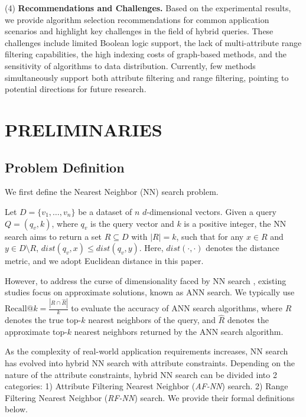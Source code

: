 \documentclass[sigconf, nonacm]{acmart}
\begin{document}
	(4)\textbf{ Recommendations and Challenges.}
	Based on the experimental results, we provide algorithm selection recommendations for common application scenarios and highlight key challenges in the field of hybrid queries. These challenges include limited Boolean logic support, the lack of multi-attribute range filtering capabilities, the high indexing costs of graph-based methods, and the sensitivity of algorithms to data distribution. Currently, few methods simultaneously support both attribute filtering and range filtering, pointing to potential directions for future research.
	
	\section{PRELIMINARIES}
	
	\subsection{Problem Definition}
	
	We first define the Nearest Neighbor (NN) search problem.
	
	\begin{definition}[NN Search]
		
		Let \( D = \{v_1, \ldots, v_n\} \) be a dataset of \( n \) \( d \)-dimensional vectors. Given a query \( Q = (q_v, k) \), where \( q_v \) is the query vector and \( k \) is a positive integer, the NN search aims to return a set \( R \subseteq D \) with \( |R| = k \), such that for any \( x \in R \) and \( y \in D \setminus R \), \( \textit{dist}\!\left(q_v, x\right) \leq \textit{dist}\!\left(q_v, y\right) \). Here, \( \textit{dist}\!\left(\cdot, \cdot\right) \) denotes the distance metric, and we adopt Euclidean distance in this paper.
	\end{definition}
	
	However, to address the curse of dimensionality faced by NN search \cite{dimcurse}, existing studies focus on approximate solutions, known as ANN  search. We typically use $\text{Recall}@k = \frac{|R \cap \hat{R}|}{k}$ to evaluate the accuracy of ANN search algorithms, where $R$ denotes the true top-$k$ nearest neighbors of the query, and $\hat{R}$ denotes the approximate top-$k$ nearest neighbors returned by the ANN search algorithm.
	
	As the complexity of real-world application requirements increases, NN search has evolved into hybrid NN search with attribute constraints. Depending on the nature of the attribute constraints, hybrid NN search can be divided into 2 categories: 1) Attribute Filtering Nearest Neighbor (\textit{AF-NN}) search. 2) Range Filtering Nearest Neighbor (\textit{RF-NN}) search. We provide their formal definitions below.
	
\end{document}
